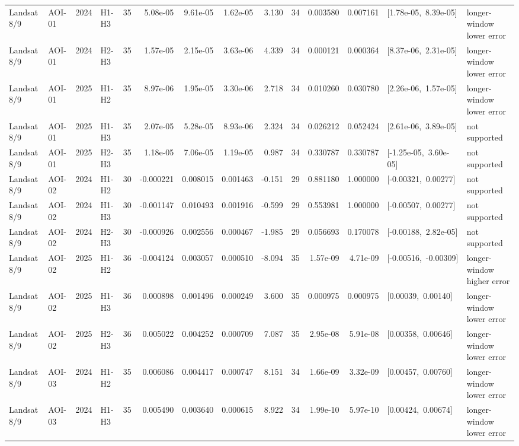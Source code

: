 \begin{longtable}{llclrrrrrrrrp{2.35cm}p{1.75cm}}
Landsat 8/9 & AOI-01 & 2024 & H1-H3 & 35 & 5.08e-05 & 9.61e-05 & 1.62e-05 & 3.130 & 34 & 0.003580 & 0.007161 & \mbox{[1.78e-05, 8.39e-05]} & longer-window lower error \\
Landsat 8/9 & AOI-01 & 2024 & H2-H3 & 35 & 1.57e-05 & 2.15e-05 & 3.63e-06 & 4.339 & 34 & 0.000121 & 0.000364 & \mbox{[8.37e-06, 2.31e-05]} & longer-window lower error \\
Landsat 8/9 & AOI-01 & 2025 & H1-H2 & 35 & 8.97e-06 & 1.95e-05 & 3.30e-06 & 2.718 & 34 & 0.010260 & 0.030780 & \mbox{[2.26e-06, 1.57e-05]} & longer-window lower error \\
Landsat 8/9 & AOI-01 & 2025 & H1-H3 & 35 & 2.07e-05 & 5.28e-05 & 8.93e-06 & 2.324 & 34 & 0.026212 & 0.052424 & \mbox{[2.61e-06, 3.89e-05]} & not supported \\
Landsat 8/9 & AOI-01 & 2025 & H2-H3 & 35 & 1.18e-05 & 7.06e-05 & 1.19e-05 & 0.987 & 34 & 0.330787 & 0.330787 & \mbox{[-1.25e-05, 3.60e-05]} & not supported \\
Landsat 8/9 & AOI-02 & 2024 & H1-H2 & 30 & -0.000221 & 0.008015 & 0.001463 & -0.151 & 29 & 0.881180 & 1.000000 & \mbox{[-0.00321, 0.00277]} & not supported \\
Landsat 8/9 & AOI-02 & 2024 & H1-H3 & 30 & -0.001147 & 0.010493 & 0.001916 & -0.599 & 29 & 0.553981 & 1.000000 & \mbox{[-0.00507, 0.00277]} & not supported \\
Landsat 8/9 & AOI-02 & 2024 & H2-H3 & 30 & -0.000926 & 0.002556 & 0.000467 & -1.985 & 29 & 0.056693 & 0.170078 & \mbox{[-0.00188, 2.82e-05]} & not supported \\
Landsat 8/9 & AOI-02 & 2025 & H1-H2 & 36 & -0.004124 & 0.003057 & 0.000510 & -8.094 & 35 & 1.57e-09 & 4.71e-09 & \mbox{[-0.00516, -0.00309]} & longer-window higher error \\
Landsat 8/9 & AOI-02 & 2025 & H1-H3 & 36 & 0.000898 & 0.001496 & 0.000249 & 3.600 & 35 & 0.000975 & 0.000975 & \mbox{[0.00039, 0.00140]} & longer-window lower error \\
Landsat 8/9 & AOI-02 & 2025 & H2-H3 & 36 & 0.005022 & 0.004252 & 0.000709 & 7.087 & 35 & 2.95e-08 & 5.91e-08 & \mbox{[0.00358, 0.00646]} & longer-window lower error \\
Landsat 8/9 & AOI-03 & 2024 & H1-H2 & 35 & 0.006086 & 0.004417 & 0.000747 & 8.151 & 34 & 1.66e-09 & 3.32e-09 & \mbox{[0.00457, 0.00760]} & longer-window lower error \\
Landsat 8/9 & AOI-03 & 2024 & H1-H3 & 35 & 0.005490 & 0.003640 & 0.000615 & 8.922 & 34 & 1.99e-10 & 5.97e-10 & \mbox{[0.00424, 0.00674]} & longer-window lower error \\

\end{longtable}
